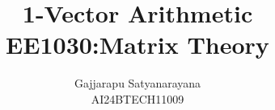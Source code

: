 \documentclass[journal]{IEEEtran}
\begin{document}

\vspace{3cm}

\title{
1-Vector Arithmetic \\
\large EE1030:Matrix Theory
}
\author{Gajjarapu Satyanarayana\\AI24BTECH11009
}
{\let\newpage\relax\maketitle}

\renewcommand{\thefigure}{\theenumi}
\renewcommand{\thetable}{\theenumi}



\renewcommand{\thetable}{\theenumi}
\end{document}
